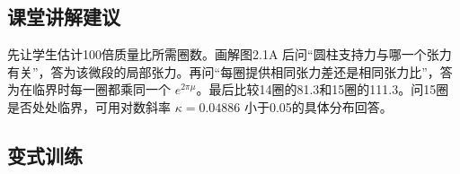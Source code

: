 \documentclass[UTF8,fontset=fandol,a4paper,11pt]{ctexart}
\begin{document}

\subsection*{课堂讲解建议}

先让学生估计100倍质量比所需圈数。画解图2.1A 后问“圆柱支持力与哪一个张力有关”，答为该微段的局部张力。再问“每圈提供相同张力差还是相同张力比”，答为在临界时每一圈都乘同一个 $e^{2\pi\mu}$。最后比较14圈的81.3和15圈的111.3。问15圈是否处处临界，可用对数斜率 $\kappa=0.04886$ 小于0.05的具体分布回答。



\subsection*{变式训练}
\end{document}
